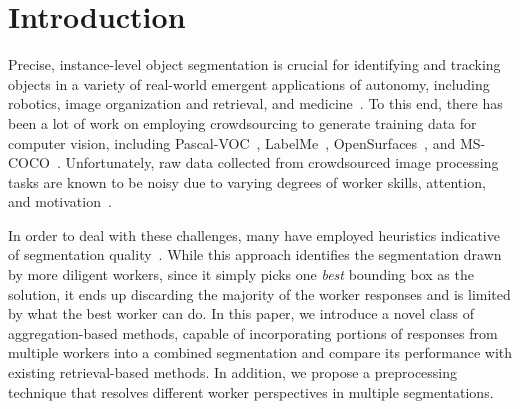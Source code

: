 \section{Introduction\label{sec:intro}}
Precise, instance-level object segmentation is crucial for identifying and tracking objects in a variety of real-world emergent applications of autonomy, including robotics\cite{Natonek1998}, image organization and retrieval\cite{Yamaguchi2012}, and medicine~\cite{Irshad2014}. To this end, there has been a lot of work on employing crowdsourcing to generate training data for computer vision, including Pascal-VOC~\cite{Everingham15}, LabelMe~\cite{Torralba2010}, OpenSurfaces~\cite{bell15minc}, and MS-COCO~\cite{Lin2012}. Unfortunately, raw data collected from crowdsourced image processing tasks are known to be noisy due to varying degrees of worker skills, attention, and motivation~\cite{bell14intrinsic,MDWWelinder2010}. 
\par In order to deal with these challenges, many have employed heuristics indicative of segmentation quality~\cite{Cabezas2015,Sameki2015,Sorokin2008}. While this approach identifies the segmentation drawn by more diligent workers, since it simply picks one \textit{best} bounding box as the solution, it ends up discarding the majority of the worker responses and is limited by what the best worker can do. In this paper, we introduce a novel class of aggregation-based methods, capable of incorporating portions of responses from multiple workers into a combined segmentation and compare its performance with existing retrieval-based methods. In addition, we propose a preprocessing technique that resolves different worker perspectives in multiple segmentations. 
% 
% 
